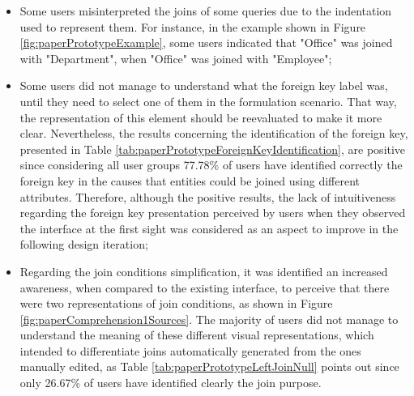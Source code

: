 \begin{itemize}
  \item Some users misinterpreted the joins of some queries due to the indentation used to represent them. For instance, in the example shown in Figure \ref{fig:paperPrototypeExample}, some users indicated that "Office" was joined with "Department", when "Office" was joined with "Employee";
  \item Some users did not manage to understand what the foreign key label was, until they need to select one of them in the formulation scenario. That way, the representation of this element should be reevaluated to make it more clear. Nevertheless, the results concerning the identification of the foreign key, presented in Table \ref{tab:paperPrototypeForeignKeyIdentification}, are positive since considering all user groups 77.78\% of users have identified correctly the foreign key in the causes that entities could be joined using different attributes. Therefore, although the positive results, the lack of intuitiveness regarding the foreign key presentation perceived by users when they observed the interface at the first sight was considered as an aspect to improve in the following design iteration;
  \item Regarding the join conditions simplification, it was identified an increased awareness, when compared to the existing interface, to perceive that there were two representations of join conditions, as shown in Figure \ref{fig:paperComprehension1Sources}. The majority of users did not manage to understand the meaning of these different visual representations, which intended to differentiate joins automatically generated from the ones manually edited, as Table \ref{tab:paperPrototypeLeftJoinNull} points out since only 26.67\% of users have identified clearly the join purpose.
\end{itemize}



